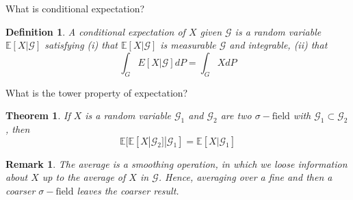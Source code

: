 \documentclass[avery5388,grid,frame]{flashcards}
\newcommand{\E}{\mathbb{E}}
\newcommand{\sigf}{\sigma-\text{field}}
\newtheorem*{theorem}{Theorem}
\newtheorem*{definition}{Definition}
\newtheorem*{remark}{Remark}
\begin{document}
\begin{flashcard}
    {What is conditional expectation?}
    \begin{definition}
        A conditional expectation of $X$ given $\mathcal G$ is a random variable $\E[X | \mathcal G]$ satisfying (i) that $\E[X | \mathcal G]$ is measurable $\mathcal G$ and integrable, (ii) that
        $$\int_G E[X | \mathcal G] dP = \int_G X dP$$
    \end{definition}
\end{flashcard}


\begin{flashcard}
    {What is the tower property of expectation?}
    \begin{theorem}
        If $X$ is a random variable $\mathcal G_1$ and $\mathcal G_2$ are two $\sigf$ with $\mathcal G_1 \subset \mathcal G_2$, then
        $$\E[\E[X | \mathcal G_2] | \mathcal G_1] = \E[X | \mathcal G_1]$$
    \end{theorem}

    \begin{remark}
        The average is a smoothing operation, in which we loose information about $X$ up to the average of $X$ in $\mathcal G$. Hence, averaging over a fine and then a coarser $\sigf$ leaves the coarser result.
    \end{remark}
\end{flashcard}
\end{document}
